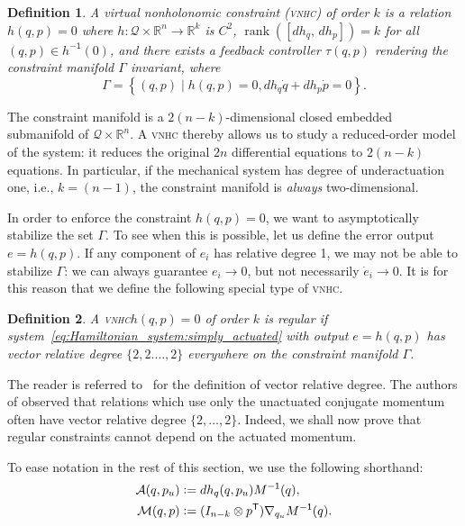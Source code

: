 \documentclass[journal,twoside,web, twocolumn]{ieeecolor}
\newtheorem{defn}{Definition} %
\DeclareMathOperator{\Rank}{rank}
\newcommand*{\rank}[1]{\Rank\left(#1\right)}
\newcommand*{\tpose}{^\mathsf{T}}
\newcommand*{\inv}{^\mathsf{-1}}
\newcommand*{\R}{\mathbb{R}}
\newcommand*{\Minv}{M^\mathsf{-1}}
\newcommand*{\Id}[1]{I_{#1}}
\newcommand*{\eqdef}{\vcentcolon=}
\newcommand*{\vnhc}{\textsc{vnhc}\xspace}
\begin{document}
\begin{defn}\label{defn:vnhc}
    A \textit{virtual nonholonomic constraint} (\vnhc) \textit{of order \(k\)}
    is a relation \(h(q,p) = 0\) where 
    \(h : \mathcal{Q}\times\R^n \rightarrow \R^k\) is \(C^2\),
    \(\rank{\left[ dh_q,\, dh_p \right]} = k\) for all 
    \((q,p) \in h\inv(0)\), and there exists a feedback
    controller \(\tau(q,p)\) rendering the \textit{constraint manifold}
    \(\Gamma\) invariant, where
\begin{equation}
        \Gamma = \left\{(q,p) \mid h(q,p) = 0, dh_q \dot{q} + dh_p \dot{p} = 0\right\}.    \end{equation}
\end{defn}

The constraint manifold is a \(2(n-k)\)-dimensional closed embedded submanifold
of \(\mathcal{Q} \times \R^n\). A \vnhc thereby allows us to study a
reduced-order model of the system: it reduces the original \(2n\) differential
equations to \(2(n-k)\) equations. In particular, if the mechanical system has
degree of underactuation one, i.e., \(k = (n-1)\), the constraint manifold is
\textit{always} two-dimensional.

In order to enforce the constraint \(h(q,p) = 0\), we want to asymptotically
stabilize the set \(\Gamma\). To see when this is possible, let us define the
error output \(e = h(q,p)\). If any component of \(e_i\) has relative degree 1,
we may not be able to stabilize \(\Gamma\): we can always guarantee 
\(e_i \to 0\), but not necessarily \(\dot{e}_i \to 0\). It is for this reason
that we define the following special type of \vnhc.

\begin{defn}
A \vnhc \(h(q,p) = 0\) of order \(k\) is \textit{regular} if system~\eqref{eq:Hamiltonian_system:simply_actuated} with output \(e = h(q,p)\) has vector relative degree \(\{2,2.\ldots,2\}\) everywhere on the constraint manifold \(\Gamma\).
\end{defn}

The reader is referred to~\cite{Isi95} for the definition of vector relative degree. The authors of \cite{nhvc_dynamic_walking,hybrid_zero_dynamics_bipedal_nhvcs} observed that relations which use only the unactuated conjugate momentum often have vector relative degree \(\{2,\ldots,2\}\). Indeed, we shall now prove that regular constraints cannot depend on the actuated momentum.

To ease notation in the rest of this section, we use the following shorthand:
\begin{align}
    \mathcal{A}(q,p_u) &\eqdef dh_q(q,p_u) \Minv(q) 
        ,\\
    \mathcal{M}(q,p) &\eqdef (\Id{n-k} \otimes p\tpose)\nabla_{q_u}\Minv(q) 
    .
\end{align}
\end{document}
